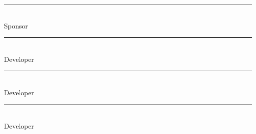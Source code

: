 \documentclass[letterpaper, 10pt,titlepage]{article}
\begin{document}
\newpage
\textbf{ }
\vspace{5.0cm}

\noindent\rule{13cm}{0.4pt}\\
Sponsor
\vspace{3.0cm}

\noindent\rule{13cm}{0.4pt}\\
Developer
\vspace{3.0cm}


\noindent\rule{13cm}{0.4pt}\\
Developer
\vspace{3.0cm}


\noindent\rule{13cm}{0.4pt}\\
Developer
\vspace{3.0cm}
\end{document}
